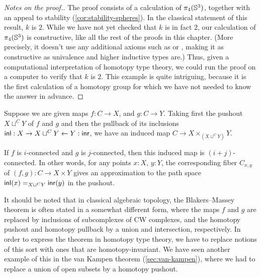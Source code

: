 \begin{proof}[Notes on the proof.]
The proof consists of a calculation of $\pi_4(\Sn ^3)$, together with an
appeal to stability (\cref{cor:stability-spheres}).  In the classical
statement of this result, $k$ is $2$.  While we have not yet checked that
$k$ is in fact $2$, our calculation of $\pi_4(\Sn ^3)$ is constructive,
like all the rest of the proofs in this chapter.
(More precisely, it doesn't use any additional axioms such as \LEM{} or \choice{}, making it as constructive as
univalence and higher inductive types are.)  Thus, given a
computational interpretation of homotopy type theory, we could run the
proof on a computer to verify that $k$ is $2$.  This example is quite
intriguing, because it is the first calculation of a homotopy group
for which we have not needed to know the answer in advance.
\end{proof}

%

\begin{thm}\label{Blakers-Massey}
  Suppose we are given maps $f : C  \rightarrow X$, and $g : C \rightarrow Y$. Taking first the pushout $X \sqcup^C Y $ of $f$ and $g$ and then the pullback of its inclusions $\inl : X \rightarrow X \sqcup^C Y \leftarrow Y : \inr$, we have an induced map $C \to X \times_{(X \sqcup^C Y)} Y$.

  If $f$ is $i$-connected and $g$ is $j$-connected, then this induced map is $(i+j)$-connected. In other words, for any points $x:X$, $y:Y$, the corresponding fiber $C_{x,y}$ of $(f,g) : C \to X \times Y $ gives an approximation to the path space $\id[X \sqcup^C Y]{\inl(x)}{\inr(y)}$ in the pushout.
\end{thm}

It should be noted that in classical algebraic topology, the Blakers--Massey theorem is often stated in a somewhat different form, where the maps $f$ and $g$ are replaced by inclusions of subcomplexes of CW complexes, and the homotopy pushout and homotopy pullback by a union and intersection, respectively.
In order to express the theorem in homotopy type theory, we have to replace notions of this sort with ones that are homotopy-invariant.
We have seen another example of this in the van Kampen theorem (\cref{sec:van-kampen}), where we had to replace a union of open subsets by a homotopy pushout.

